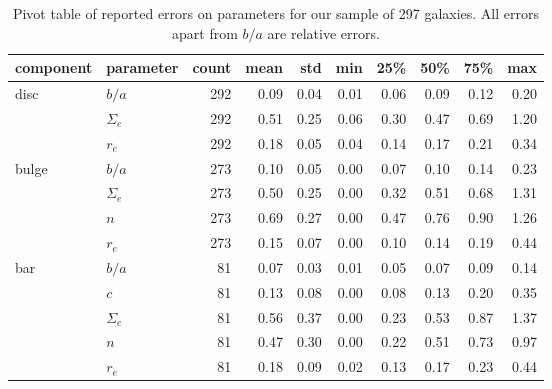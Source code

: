 \documentclass[../main.tex]{subfiles}
\begin{document}
\begin{table}
  \centering
  \caption{Pivot table of reported errors on parameters for our sample of 297 galaxies. All errors apart from $b/a$ are relative errors.}
  \begin{tabular}{l|l|rrrrrrrr}
  \hline
  component & parameter &  count &  mean &   std &   min &   25\% &   50\% &   75\% &    max \\
  \hline
  disc  & $b/a$      &  292 &  0.09 &  0.04 &  0.01 &  0.06 &  0.09 &  0.12 &  0.20 \\
        & $\Sigma_e$ &  292 &  0.51 &  0.25 &  0.06 &  0.30 &  0.47 &  0.69 &  1.20 \\
        & $r_e$      &  292 &  0.18 &  0.05 &  0.04 &  0.14 &  0.17 &  0.21 &  0.34 \\
  bulge & $b/a$      &  273 &  0.10 &  0.05 &  0.00 &  0.07 &  0.10 &  0.14 &  0.23 \\
        & $\Sigma_e$ &  273 &  0.50 &  0.25 &  0.00 &  0.32 &  0.51 &  0.68 &  1.31 \\
        & $n$        &  273 &  0.69 &  0.27 &  0.00 &  0.47 &  0.76 &  0.90 &  1.26 \\
        & $r_e$      &  273 &  0.15 &  0.07 &  0.00 &  0.10 &  0.14 &  0.19 &  0.44 \\
  bar   & $b/a$      &   81 &  0.07 &  0.03 &  0.01 &  0.05 &  0.07 &  0.09 &  0.14 \\
        & $c$        &   81 &  0.13 &  0.08 &  0.00 &  0.08 &  0.13 &  0.20 &  0.35 \\
        & $\Sigma_e$ &   81 &  0.56 &  0.37 &  0.00 &  0.23 &  0.53 &  0.87 &  1.37 \\
        & $n$        &   81 &  0.47 &  0.30 &  0.00 &  0.22 &  0.51 &  0.73 &  0.97 \\
        & $r_e$      &   81 &  0.18 &  0.09 &  0.02 &  0.13 &  0.17 &  0.23 &  0.44 \\
  \hline
  \end{tabular}
  \label{table:error_values}
\end{table}
\end{document}
